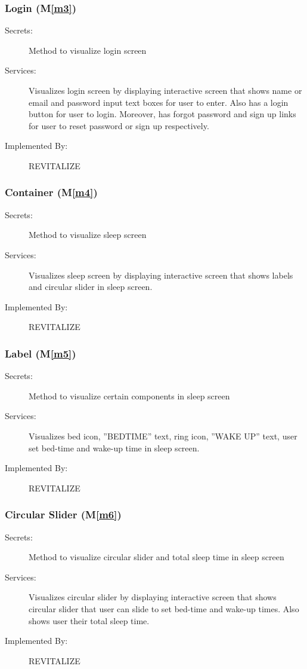 \documentclass[12pt, titlepage]{article}
\newcommand{\mref}[1]{M\ref{#1}}
\begin{document}
\subsubsection{Login (\mref{m3})}
\begin{description}
	\item[Secrets:]Method to visualize login screen
	\item[Services:]Visualizes login screen by displaying interactive screen that shows name or email and password input text boxes for user to enter. Also has a login button for user to login. Moreover, has forgot password and sign up links for user to reset password or sign up respectively.
	\item[Implemented By:] REVITALIZE
\end{description}

\subsubsection{Container (\mref{m4})}
\begin{description}
	\item[Secrets:]Method to visualize sleep screen
	\item[Services:]Visualizes sleep screen by displaying interactive screen that shows labels and circular slider in sleep screen.
	\item[Implemented By:] REVITALIZE
\end{description}

\subsubsection{Label (\mref{m5})}
\begin{description}
	\item[Secrets:]Method to visualize certain components in sleep screen
	\item[Services:]Visualizes bed icon, ”BEDTIME” text, ring icon, ”WAKE UP” text, user set bed-time and wake-up time in sleep screen.
	\item[Implemented By:] REVITALIZE
\end{description}

\subsubsection{Circular Slider (\mref{m6})}
\begin{description}
	\item[Secrets:]Method to visualize circular slider and total sleep time in sleep screen
	\item[Services:]Visualizes circular slider by displaying interactive screen that shows circular slider that user can slide to set bed-time and wake-up times. Also shows user their total sleep time.
	\item[Implemented By:] REVITALIZE
\end{description}
\end{document}
